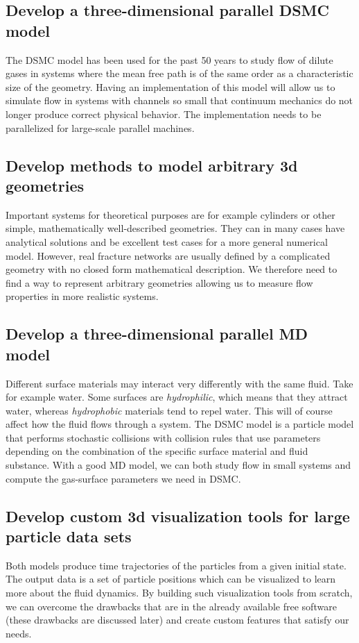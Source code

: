 \subsection{Develop a three-dimensional parallel DSMC model}
\label{goal:dsmc_1}
The DSMC model has been used for the past 50 years to study flow of dilute gases in systems where the mean free path is of the same order as a characteristic size of the geometry. Having an implementation of this model will allow us to simulate flow in systems with channels so small that continuum mechanics do not longer produce correct physical behavior. The implementation needs to be parallelized for large-scale parallel machines.
\subsection{Develop methods to model arbitrary 3d geometries}
\label{goal:dsmc_2}
Important systems for theoretical purposes are for example cylinders or other simple, mathematically well-described geometries. They can in many cases have analytical solutions and be excellent test cases for a more general numerical model. However, real fracture networks are usually defined by a complicated geometry with no closed form mathematical description. We therefore need to find a way to represent arbitrary geometries allowing us to measure flow properties in more realistic systems.
\subsection{Develop a three-dimensional parallel MD model}
\label{goal:md_1}
Different surface materials may interact very differently with the same fluid. Take for example water. Some surfaces are \textit{hydrophilic}, which means that they attract water, whereas \textit{hydrophobic} materials tend to repel water. This will of course affect how the fluid flows through a system. The DSMC model is a particle model that performs stochastic collisions with collision rules that use parameters depending on the combination of the specific surface material and fluid substance. With a good MD model, we can both study flow in small systems and compute the gas-surface parameters we need in DSMC. 
\subsection{Develop custom 3d visualization tools for large particle data sets}
\label{goal:vis}
Both models produce time trajectories of the particles from a given initial state. The output data is a set of particle positions which can be visualized to learn more about the fluid dynamics. By building such visualization tools from scratch, we can overcome the drawbacks that are in the already available free software (these drawbacks are discussed later) and create custom features that satisfy our needs. 

